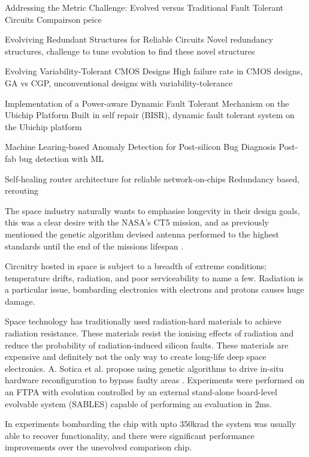 \todo Addressing the Metric Challenge: Evolved versus Traditional Fault Tolerant Circuits\cite{4291951}
Compairson peice

\todo Evolviving Redundant Structures for Reliable Circuits\cite{4291954}
Novel redundancy structures, challenge to tune evolution to find these novel structures

\todo Evolving Variability-Tolerant CMOS Designs\cite{10.1007/978-3-540-85857-7_27}
High failure rate in CMOS designs, GA vs CGP, unconventional designs with variability-tolerance

\todo Implementation of a Power-aware Dynamic Fault Tolerant Mechanism on the Ubichip Platform\cite{10.1007/978-3-642-15323-5_26}
Built in self repair (BISR), dynamic fault tolerant system on the Ubichip platform

\todo Machine Learing-based Anomaly Detection for Post-silicon Bug Diagnosis\cite{6513558}
Post-fab bug detection with ML

\todo Self-healing router architecture for reliable network-on-chips\cite{8292030}
Redundancy based, rerouting

The space industry naturally wants to emphasise longevity in their design goals,
this was a clear desire with the NASA's CT5 mission, and as previously mentioned
the genetic algorithm devised antenna performed to the highest standards until the
end of the missions lifespan \cite{Antenna}.

Circuitry hosted in space is subject to a breadth of extreme conditions; temperature
drifts, radiation, and poor serviceability to name a few. Radiation is a particular
issue, bombarding electronics with electrons and protons causes huge damage.

Space technology has traditionally used radiation-hard materials to achieve
radiation resistance. These materials resist the ionising effects of radiation
and reduce the probability of radiation-induced silicon faults. These materials
are expensive and definitely not the only way to create long-life deep space
electronics. A. Sotica et al. propose using genetic algorithms to drive
in-situ hardware reconfiguration to bypass faulty areas \cite{1331112}. Experiments
were performed on an FTPA with evolution controlled by an external stand-alone
board-level evolvable system (SABLES) capable of performing an evaluation in 2ms.

In experiments bombarding the chip with upto 350krad the system was usually able
to recover functionality, and there were significant performance improvements over
the unevolved comparison chip.

